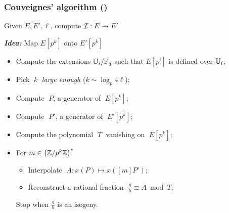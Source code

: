 \documentclass[10pt,usepdftitle=false]{beamer}
\begin{document}

\begin{frame}
  \frametitle{Couveignes' algorithm (\cite{couveignes96})}
  
  \begin{center}
    \large
    Given $E, E', \ell$, compute $\mathcal{I}:E\to E'$
  \end{center}

  \begin{center}
    \emph{\textbf{Idea:}} Map $E[p^k]$ onto $E'[p^k]$
  \end{center}
  
  \begin{itemize}
  \item Compute the extensions $\mathbb{U}_i/\mathbb{F}_q$ such that $E[p^i]$ is
    defined over $\mathbb{U}_i$;
  \item Pick $\;k\;$ \emph{large enough} ($k\sim\log_p4\ell$);
  \item Compute $\;P$, a generator of $\;E[p^k]$;
  \item Compute $\;P'$, a generator of $\;E'[p^k]$;
  \item Compute the polynomial $\;T\;$ vanishing on $\;E[p^k]$;
  \item For $m\in\left(\mathbb{Z}/p^k\mathbb{Z}\right)^\ast$
    \begin{itemize}
      \normalsize
    \item Interpolate $\;A : x(P) \mapsto x([m]P')$;
    \item Reconstruct a rational fraction  $\;\frac{g}{h}\equiv A \bmod T$;
    \end{itemize}
    \alert<3>{Stop when $\frac{g}{h}$ is an isogeny.}
  \end{itemize}
\end{frame}

\end{document}
